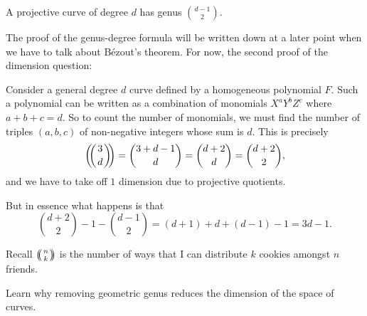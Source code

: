 \documentclass[12pt]{memoir}
\begin{document}
\begin{Prop}\label{prop-genus-degree-formula}
    A projective curve of degree $d$ has genus $\binom{d-1}{2}$.
\end{Prop}

The proof of the genus-degree formula will be written down at a later point when we have to talk about Bézout's theorem. For now, the second proof of the dimension question:

\begin{ptcbp}
    Consider a general degree $d$ curve defined by a homogeneous polynomial $F$. Such a polynomial can be written as a combination of monomials $X^{a}Y^{b}Z^{c}$ where $a+b+c=d$. So to count the number of monomials, we must find the number of triples $(a,b,c)$ of non-negative integers whose sum is $d$. This is precisely 
    $$\multinom{3}{d}=\binom{3+d-1}{d}=\binom{d+2}{d}=\binom{d+2}{2},$$
    and we have to take off $1$ dimension due to projective quotients.\par 
     But in essence what happens is that 
    $$\binom{d+2}{2}-1-\binom{d-1}{2}=(d+1)+d+(d-1)-1=3d-1.$$
\end{ptcbp}

\begin{Rmk}
    Recall $\multinom{n}{k}$ is the number of ways that I can distribute $k$ cookies amongst $n$ friends.
\end{Rmk}

\begin{Ej}
Learn why removing geometric genus reduces the dimension of the space of curves.
\end{Ej}
\end{document}
